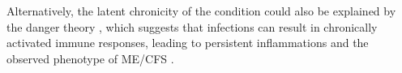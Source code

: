 Alternatively, the latent chronicity of the condition could also be explained by the danger theory \citep{pradeu2012DangerTheory}, which suggests that infections can result in chronically activated immune responses, leading to persistent inflammations and the observed phenotype of ME/CFS \citep{sepulveda2019MyalgicEncephalomyelitis, fonseca2024IgGAntibody}.











